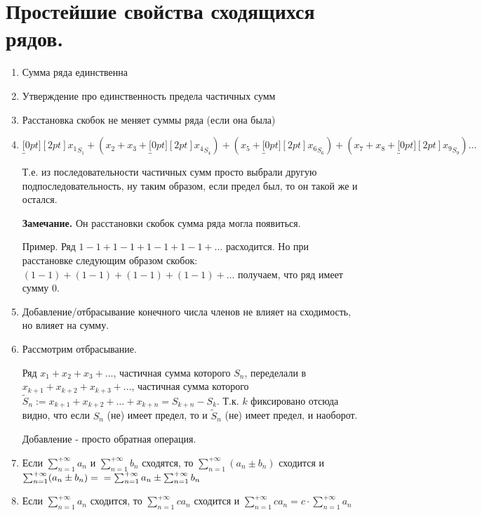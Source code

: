 \documentclass[12pt,letterpaper]{report}
\makeatletter
\theoremstyle{definition}
\renewenvironment{proof}[1][\proofname]{%
   \par\pushQED{\qed}\normalfont%
   \topsep6\p@\@plus6\p@\relax
   \trivlist\item[\hskip\labelsep\bfseries#1\@addpunct{.}]%
   \ignorespaces
}{%
   \popQED\endtrivlist\@endpefalse
}
\makeatother
\begin{document}
\section{Простейшие свойства сходящихся рядов.}

\begin{enumerate}
    \item Сумма ряда единственна
    
    \begin{proof}
        Утверждение про единственность предела частичных сумм
    \end{proof}

    \item Расстановка скобок не меняет суммы ряда (если она была)
    
    \begin{proof}
        $\underbracket[0pt][2pt]{x_1}_{S_1} + (x_2 + x_3 +
        \underbracket[0pt][2pt]{x_4}_{S_4}) + (x_5 + 
        \underbracket[0pt][2pt]{x_6}_{S_6}) + (x_7 + x_8 + 
        \underbracket[0pt][2pt]{x_9}_{S_9})...$

        Т.е. из последовательности частичных сумм просто выбрали
        другую подпоследовательность, ну таким образом, если предел был,
        то он такой же и остался.
    \end{proof}

    \textbf{Замечание.} Он расстановки скобок сумма ряда могла
    появиться.

    Пример. Ряд $1 - 1 + 1 - 1 + 1 - 1 + 1 - 1 + \dots$ расходится.
    Но при расстановке следующим образом скобок:
    $(1 - 1) + (1 - 1) + (1 - 1) + (1 - 1) + \dots$ получаем, что ряд
    имеет сумму $0$.

    \item Добавление/отбрасывание конечного числа членов не влияет на
    сходимость, но влияет на сумму.

    \begin{proof}
        Рассмотрим отбрасывание.

        Ряд $x_1 + x_2 + x_3 + \dots$, частичная сумма которого
        $S_n$, переделали в $x_{k+1} + x_{k+2} + x_{k+3} + \dots$,
        частичная сумма которого $\widetilde{S}_n := x_{k+1} + x_{k+2}
        + \dots + x_{k+n} = S_{k + n} - S_{k}$. Т.к. $k$ фиксировано
        отсюда видно, что если $S_n$ (не) имеет предел, то и
        $\widetilde{S}_n$ (не) имеет предел, и наоборот.

        Добавление - просто обратная операция.
    \end{proof}

    \item Если $\sum_{n = 1}^{+\infty} a_n$ и $\sum_{n = 1}^{+\infty} b_n$
    сходятся, то $\sum_{n = 1}^{+\infty} (a_n \pm b_n)$ сходится и
    $\sum_{n = 1}^{+\infty} (a_n \pm b_n) =\\= \sum_{n = 1}^{+\infty} a_n
    \pm \sum_{n = 1}^{+\infty} b_n$

    \item Если $\sum_{n = 1}^{+\infty} a_n$ сходится, то
    $\sum_{n = 1}^{+\infty} c a_n$ сходится и $\sum_{n = 1}^{+\infty} 
    c a_n = c \cdot \sum_{n = 1}^{+\infty} a_n$
\end{enumerate}
    
\ifdefined\niveldos\else
\end{document}
